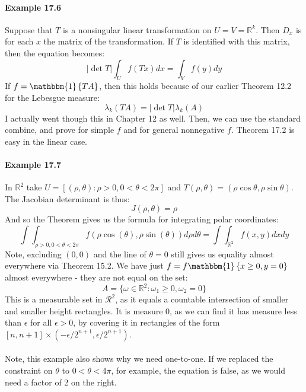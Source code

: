 \documentclass[12pt,a4paper]{article}
\newcommand{\1}[1]{\mathbbm{1}\left\{ #1 \right\}}
\newcommand{\R}{\mathbb{R}}
\newcommand{\rcal}{\mathcal{R}}
\begin{document}
\paragraph{Example 17.6} Suppose that $T$ is a nonsingular linear transformation on $U = V = \R^k$. Then $D_x$ is for each $x$ the matrix of the transformation. If $T$ is identified with this matrix, then the equation becomes:
$$
	|\det T| \int_U f(Tx) dx = \int_V f(y) dy
$$
If $f = \1{TA}$, then this holds because of our earlier Theorem 12.2 for the Lebesgue measure:
$$
	\lambda_k(TA) = |\det T|\lambda_k(A)
$$
I actually went though this in Chapter 12 as well. Then, we can use the standard combine, and prove for simple $f$ and for general nonnegative $f$. Theorem 17.2 is easy in the linear case.

\paragraph{Example 17.7} In $\R^2$ take $U = \left[(\rho,\theta): \rho > 0, 0 < \theta < 2\pi\right]$ and $T(\rho, \theta) = (\rho \cos \theta, \rho \sin \theta)$. The Jacobian determinant is thus:
$$
	J(\rho, \theta) = \rho
$$
And so the Theorem gives us the formula for integrating polar coordinates:
$$
	\int\int_{\rho > 0, 0 < \theta < 2\pi} f(\rho\cos(\theta), \rho\sin(\theta)) d\rho d\theta=
	\int\int_{\R^2} f(x,y) dxdy
$$
Note, excluding $(0,0)$ and the line of $\theta = 0$ still gives us equality almost everywhere via Theorem 15.2. We have just $f = f\1{x \geq 0, y = 0}$ almost everywhere - they are not equal on the set:
$$
	A = \{\omega \in \R^2 : \omega_1 \geq 0, \omega_2 = 0\}
$$
This is a measurable set in $\rcal^2$, as it equals a countable intersection of smaller and smaller height rectangles. It is measure $0$, as we can find it has measure less than $\epsilon$ for all $\epsilon > 0$, by covering it in rectangles of the form $[n, n + 1] \times (-\epsilon/2^{n+1}, \epsilon/2^{n+1})$.
\\\\
Note, this example also shows why we need one-to-one. If we replaced the constraint on $\theta$ to $0 < \theta < 4\pi$, for example, the equation is false, as we would need a factor of 2 on the right. 
\end{document}
